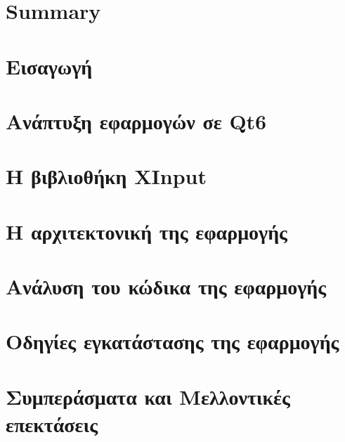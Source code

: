 \documentclass[a4paper,11pt,oneside,openany]{ioniothesis}
\begin{document}
\chapter*{Summary} \pagestyle{headings}


\cleardoublepage

\cleardoublepage

\tableofcontents

\cleardoublepage
\listoffigures

\setlength{\parskip}{5pt}

\pagestyle{headings}
\cleardoublepage

\newpage
{}

\cleardoublepage

\chapter{Εισαγωγή} \label{chapter:intro}


\chapter{Ανάπτυξη εφαρμογών σε Qt6} \label{chapter:qt6}


\chapter{Η βιβλιοθήκη XInput} \label{chapter:xinput}


\chapter{Η αρχιτεκτονική της εφαρμογής} \label{chapter:app}


\chapter{Ανάλυση του κώδικα της εφαρμογής} \label{chapter:source}


\chapter{Οδηγίες εγκατάστασης της εφαρμογής} \label{chapter:installation}


\chapter{Συμπεράσματα και Μελλοντικές επεκτάσεις} \label{chapter:telos}

\end{document}
